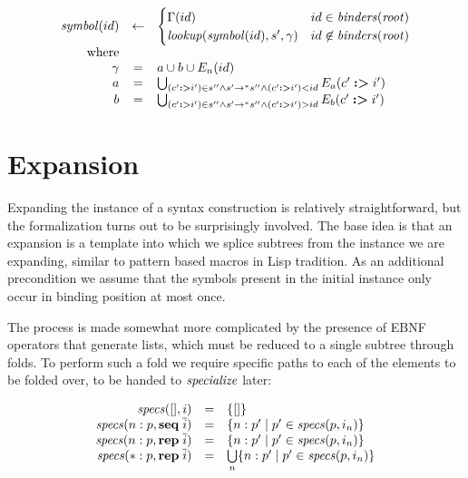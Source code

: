 \documentclass{kththesis}
\begin{document}
$$
\begin{array}{rcl}
\mathit{symbol}(id) & <- &
\begin{cases}
\Gamma(id) & id \in \mathit{binders}(\mathit{root}) \\
\mathit{lookup}(\mathit{symbol}(id), s', \gamma) & id \not\in \mathit{binders}(\mathit{root}) \\
\end{cases} \\
\text{where} & & \\
\gamma & = & a \cup b \cup E_n(id) \\
a & = & \bigcup_{(c' \mathrel{\textbf{:>}} i') \in s'' \land s' ->* s'' \land (c' \mathrel{\textbf{:>}} i') < id} E_a(c' \mathrel{\textbf{:>}} i') \\
b & = & \bigcup_{(c' \mathrel{\textbf{:>}} i') \in s'' \land s' ->* s'' \land (c' \mathrel{\textbf{:>}} i') > id} E_b(c' \mathrel{\textbf{:>}} i') \\
\end{array}
$$

\section{Expansion} \label{sec:expansion-formalization}

Expanding the instance of a syntax construction is relatively straightforward, but the formalization turns out to be surprisingly involved. The base idea is that an expansion is a template into which we splice subtrees from the instance we are expanding, similar to pattern based macros in Lisp tradition. As an additional precondition we assume that the symbols present in the initial instance only occur in binding position at most once.

The process is made somewhat more complicated by the presence of EBNF operators that generate lists, which must be reduced to a single subtree through folds. To perform such a fold we require specific paths to each of the elements to be folded over, to be handed to $\mathit{specialize}$ later:

\newcommand{\specs}{\ensuremath{\mathit{specs}}}

$$
\begin{array}{rcl}
\specs([], i) & = & \{[]\} \\
\specs(n:p, \seq \overline{i}) & = & \{n : p' \mid p' \in \specs(p, i_n)\} \\
\specs(n:p, \repseq \overline{i}) & = & \{n : p' \mid p' \in \specs(p, i_n)\} \\
\specs(*:p, \repseq \overline{i}) & = & \bigcup\limits_{n} \{n:p' \mid p' \in \specs(p, i_n)\} \\
\end{array}
$$
\end{document}
